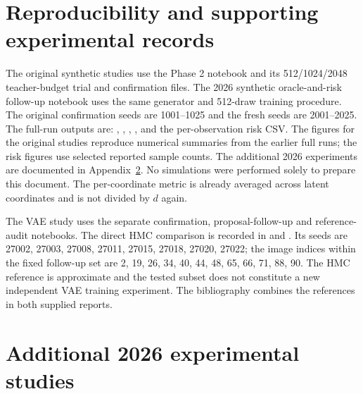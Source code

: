 \documentclass[10pt,letterpaper]{article}
\begin{document}
\section{Reproducibility and supporting experimental records}
The original synthetic studies use the Phase 2 notebook and its 512/1024/2048 teacher-budget trial and confirmation files. The 2026 synthetic oracle-and-risk follow-up notebook uses the same generator and 512-draw training procedure. The original confirmation seeds are 1001--1025 and the fresh seeds are 2001--2025. The full-run outputs are: , , , , and the per-observation risk CSV. The figures for the original studies reproduce numerical summaries from the earlier full runs; the risk figures use selected reported sample counts. The additional 2026 experiments are documented in Appendix~\ref{app:new}. No simulations were performed solely to prepare this document. The per-coordinate metric is already averaged across latent coordinates and is not divided by $d$ again.

The VAE study uses the separate confirmation, proposal-follow-up and reference-audit notebooks. The direct HMC comparison is recorded in  and . Its seeds are 27002, 27003, 27008, 27011, 27015, 27018, 27020, 27022; the image indices within the fixed follow-up set are 2, 19, 26, 34, 40, 44, 48, 65, 66, 71, 88, 90. The HMC reference is approximate and the tested subset does not constitute a new independent VAE training experiment. The bibliography combines the references in both supplied reports.

\section{Additional 2026 experimental studies}\label{app:new}
\end{document}
